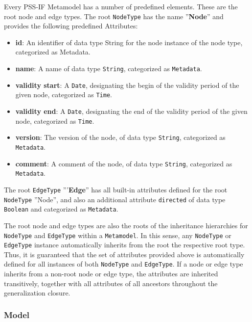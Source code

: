 Every PSS-IF Metamodel has a number of predefined elements. These are the root node and edge types. The root \texttt{NodeType} has the name ''\textbf{Node}'' and provides the following predefined Attributes:

\begin{itemize}
\item \textbf{id}: An identifier of data type String for the node instance of the node type, categorized as Metadata.
\item \textbf{name}: A name of data type \texttt{String}, categorized as \texttt{Metadata}.
\item \textbf{validity start}: A \texttt{Date}, designating the begin of the validity period of the given node, categorized as \texttt{Time}.
\item \textbf{validity end}: A \texttt{Date}, designating the end of the validity period of the given node, categorized as \texttt{Time}.
\item \textbf{version}: The version of the node, of data type \texttt{String}, categorized as \texttt{Metadata}.
\item \textbf{comment}: A comment of the node, of data type \texttt{String}, categorized as \texttt{Metadata}.
\end{itemize}

The root \texttt{EdgeType} '''\textbf{Edge}'' has all built-in attributes defined for the root \texttt{NodeType} ''Node'', and also an additional attribute \texttt{directed} of data type \texttt{Boolean} and categorized as \texttt{Metadata}. 

The root node and edge types are also the roots of the inheritance hierarchies for \texttt{NodeType} and \texttt{EdgeType} within a \texttt{Metamodel}. In this sense, any \texttt{NodeType} or \texttt{EdgeType} instance automatically inherits from the root the respective root type. Thus, it is guaranteed that the set of attributes provided above is automatically defined for all instances of both \texttt{NodeType} and \texttt{EdgeType}. If a node or edge type inherits from a non-root node or edge type, the attributes are inherited transitively, together with all attributes of all ancestors throughout the generalization closure.

\subsubsection{Model}

